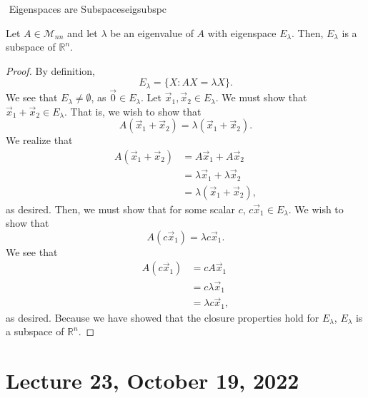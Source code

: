         \begin{theorem}{\Stop\,\,Eigenspaces are Subspaces}{eigsubspc}

            Let \(A\in\mathcal{M}_{nn}\) and let \(\lambda\) be an eigenvalue of \(A\) with eigenspace \(E_\lambda\). Then, \(E_\lambda\) is a subspace of \(\mathbb{R}^n\).
            \begin{proof}
                By definition,
                \begin{equation*}
                    E_\lambda=\{X:AX=\lambda X\}.
                \end{equation*}
                We see that \(E_\lambda\neq\emptyset\), as \(\vec{0}\in E_\lambda\). Let \(\vec{x}_1,\vec{x}_2\in E_\lambda\). We must show that \(\vec{x}_1+\vec{x}_2\in E_\lambda\). That is, we wish to show that
                \begin{equation*}
                    A(\vec{x}_1+\vec{x}_2)=\lambda(\vec{x}_1+\vec{x}_2).
                \end{equation*}
                We realize that
                \begin{align*}
                    A(\vec{x}_1+\vec{x}_2)&=A\vec{x}_1+A\vec{x}_2 \\
                    &=\lambda\vec{x}_1+\lambda\vec{x}_2 \\
                    &=\lambda(\vec{x}_1+\vec{x}_2),
                \end{align*}
                as desired. Then, we must show that for some scalar \(c\), \(c\vec{x}_1\in E_\lambda\). We wish to show that 
                \begin{equation*}
                    A(c\vec{x}_1)=\lambda c\vec{x}_1.    
                \end{equation*}
                We see that
                \begin{align*}
                    A(c\vec{x}_1)&=cA\vec{x}_1 \\
                    &=c\lambda\vec{x}_1 \\
                    &=\lambda c\vec{x}_1,
                \end{align*}
                as desired. Because we have showed that the closure properties hold for \(E_\lambda\), \(E_\lambda\) is a subspace of \(\mathbb{R}^n\).
            \end{proof}

        \end{theorem}
        \pagebreak

\section{Lecture 23, October 19, 2022}

